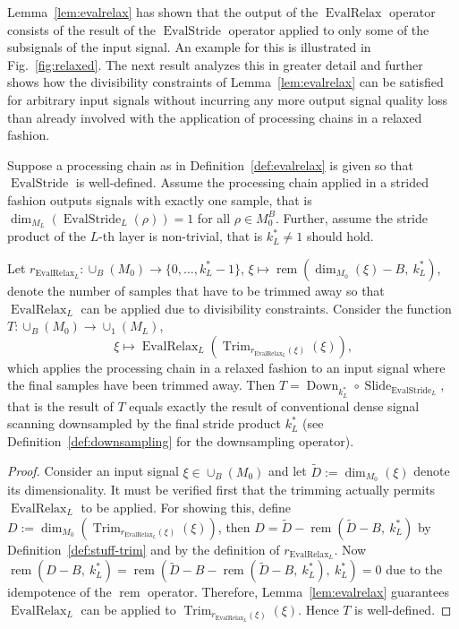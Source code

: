 \documentclass[journal]{IEEEtran}
\newcommand{\ROI}{B}
\newcommand{\discint}[2]{\{#1,\dotsc,#2\}}
\DeclareMathOperator{\Slide}{Slide}
\DeclareMathOperator{\EvalStride}{EvalStride}
\DeclareMathOperator{\Trimming}{Trim}
\newcommand{\rem}[2]{\operatorname{rem}(#1,\ #2)}
\DeclareMathOperator{\EvalRelax}{EvalRelax}
\DeclareMathOperator{\Downsampling}{Down}
\begin{document}
Lemma~\ref{lem:evalrelax} has shown that the output of the $\EvalRelax$ operator consists of the result of the $\EvalStride$ operator applied to only some of the subsignals of the input signal.
An example for this is illustrated in Fig.~\ref{fig:relaxed}.
The next result analyzes this in greater detail and further shows how the divisibility constraints of Lemma~\ref{lem:evalrelax} can be satisfied for arbitrary input signals without incurring any more output signal quality loss than already involved with the application of processing chains in a relaxed fashion.
\begin{theorem}
\label{tmh:evalrelax}
Suppose a processing chain as in Definition~\ref{def:evalrelax} is given so that $\EvalStride$ is well-defined.
Assume the processing chain applied in a strided fashion outputs signals with exactly one sample, that is $\dim_{M_L}(\EvalStride_L(\rho)) = 1$ for all $\rho\in M_0^\ROI$.
Further, assume the stride product of the $L$-th layer is non-trivial, that is $k_L^*\neq 1$ should hold.

Let $r_{\EvalRelax_L}\colon\cup_\ROI(M_0)\to\discint{0}{k_L^* - 1}$, $\xi\mapsto\rem{\dim_{M_0}(\xi) - \ROI}{k_L^*}$, denote the number of samples that have to be trimmed away so that $\EvalRelax_L$ can be applied due to divisibility constraints.
Consider the function $T\colon\cup_\ROI(M_0)\to\cup_1(M_L)$,
\begin{displaymath}
  \xi\mapsto\EvalRelax_L(\Trimming_{r_{\EvalRelax_L}(\xi)}(\xi))\text{,}
\end{displaymath}
which applies the processing chain in a relaxed fashion to an input signal where the final samples have been trimmed away.
Then $T = \Downsampling_{k_L^*}\circ \Slide_{\EvalStride_L}$, that is the result of $T$ equals exactly the result of conventional dense signal scanning downsampled by the final stride product $k_L^*$ (see Definition~\ref{def:downsampling} for the downsampling operator).
\end{theorem}\begin{proof}
Consider an input signal $\xi\in\cup_\ROI(M_0)$ and let $\tilde{D} := \dim_{M_0}(\xi)$ denote its dimensionality.
It must be verified first that the trimming actually permits $\EvalRelax_L$ to be applied.
For showing this, define $D := \dim_{M_0}(\Trimming_{r_{\EvalRelax_L}(\xi)}(\xi))$, then $D = \tilde{D} - \rem{\tilde{D} - \ROI}{k_L^*}$ by Definition~\ref{def:stuff-trim} and by the definition of $r_{\EvalRelax_L}$.
Now $\rem{D - \ROI}{k_L^*} = \rem{\tilde{D} - \ROI - \rem{\tilde{D} - \ROI}{k_L^*}}{k_L^*} = 0$ due to the idempotence of the $\operatorname{rem}$ operator.
Therefore, Lemma~\ref{lem:evalrelax} guarantees $\EvalRelax_L$ can be applied to $\Trimming_{r_{\EvalRelax_L}(\xi)}(\xi)$.
Hence $T$ is well-defined.


\end{proof}
\end{document}
